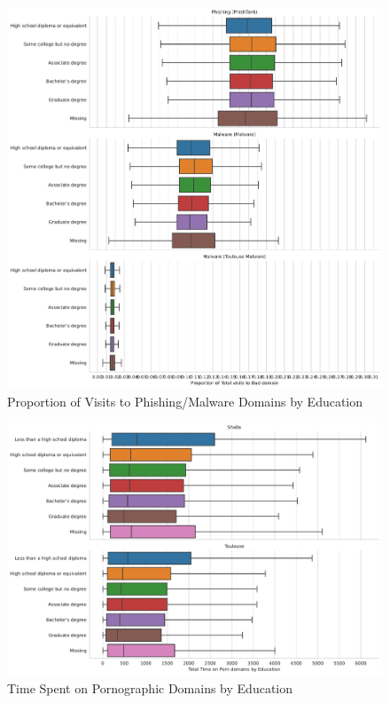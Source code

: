 \documentclass[12pt, letterpaper]{article}
\begin{document}
\begin{figure}[!htb]
  \centering
  \caption{Proportion of Visits to Phishing/Malware Domains by Education}
	\label{fig:prop_total_visits_phishing_malware_educ}
	\includegraphics[width=\textwidth]{../figs/prop_total_visits_phishing_malware_tl_educ.pdf}
\end{figure}

\begin{figure}[!htb]
  \centering
  \caption{Time Spent on Pornographic Domains by Education}
  \label{fig:total_time_porn_educ}
  \includegraphics[width=\textwidth]{../figs/total_time_porn_educ.pdf}
\end{figure}
\end{document}
